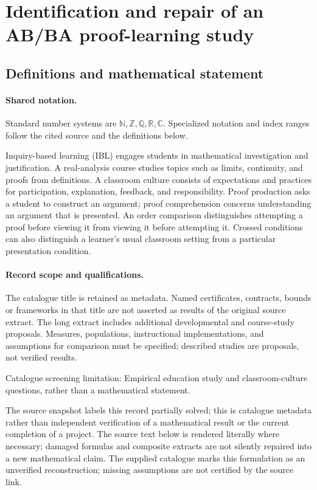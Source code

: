 \documentclass[11pt]{article}
\begin{document}
\section{Identification and repair of an AB/BA proof-learning study}\label{statement}

\subsection{Definitions and mathematical statement}

\paragraph{Shared notation.}Standard number systems are $\mathbb N,\mathbb Z,\mathbb Q,\mathbb R,\mathbb C$. Specialized notation and index ranges follow the cited source and the definitions below.


Inquiry-based learning (IBL) engages students in mathematical investigation and justification. A real-analysis course studies topics such as limits, continuity, and proofs from definitions. A classroom culture consists of expectations and practices for participation, explanation, feedback, and responsibility. Proof production asks a student to construct an argument; proof comprehension concerns understanding an argument that is presented. An order comparison distinguishes attempting a proof before viewing it from viewing it before attempting it. Crossed conditions can also distinguish a learner's usual classroom setting from a particular presentation condition.
\paragraph{Record scope and qualifications.}
The catalogue title is retained as metadata. Named certificates, contracts, bounds or frameworks in that title are not asserted as results of the original source extract.
The long extract includes additional developmental and course-study proposals. Measures, populations, instructional implementations, and assumptions for comparison must be specified; described studies are proposals, not verified results.

Catalogue screening limitation: Empirical education study and classroom-culture questions, rather than a mathematical statement.

The source snapshot labels this record partially solved; this is catalogue metadata rather than independent verification of a mathematical result or the current completion of a project.
The source text below is rendered literally where necessary; damaged formulas and composite extracts are not silently repaired into a new mathematical claim.
The supplied catalogue marks this formulation as an unverified reconstruction; missing assumptions are not certified by the source link.
\end{document}
